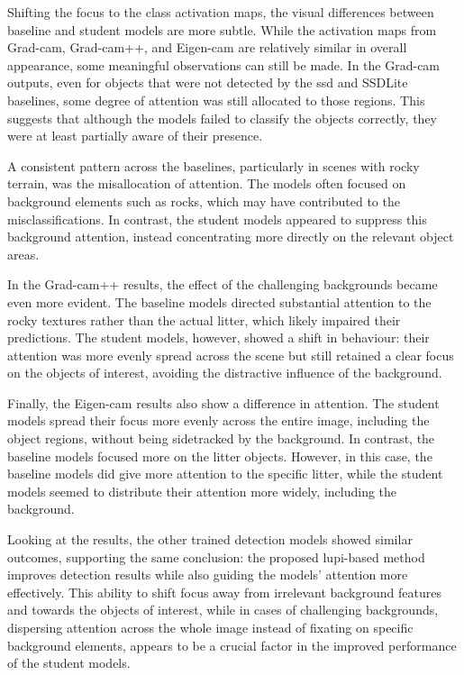Shifting the focus to the class activation maps, the visual differences between baseline and student models are more subtle. While the activation maps from Grad-\gls{cam}, Grad-\gls{cam}++, and Eigen-\gls{cam} are relatively similar in overall appearance, some meaningful observations can still be made. In the Grad-\gls{cam} outputs, even for objects that were not detected by the \gls{ssd} and SSDLite baselines, some degree of attention was still allocated to those regions. This suggests that although the models failed to classify the objects correctly, they were at least partially aware of their presence.

A consistent pattern across the baselines, particularly in scenes with rocky terrain, was the misallocation of attention. The models often focused on background elements such as rocks, which may have contributed to the misclassifications. In contrast, the student models appeared to suppress this background attention, instead concentrating more directly on the relevant object areas.

In the Grad-\gls{cam}++ results, the effect of the challenging backgrounds became even more evident. The baseline models directed substantial attention to the rocky textures rather than the actual litter, which likely impaired their predictions. The student models, however, showed a shift in behaviour: their attention was more evenly spread across the scene but still retained a clear focus on the objects of interest, avoiding the distractive influence of the background.

Finally, the Eigen-\gls{cam} results also show a difference in attention. The student models spread their focus more evenly across the entire image, including the object regions, without being sidetracked by the background. In contrast, the baseline models focused more on the litter objects. However, in this case, the baseline models did give more attention to the specific litter, while the student models seemed to distribute their attention more widely, including the background.

Looking at the results, the other trained detection models showed similar outcomes, supporting the same conclusion: the proposed \gls{lupi}-based method improves detection results while also guiding the models' attention more effectively. This ability to shift focus away from irrelevant background features and towards the objects of interest, while in cases of challenging backgrounds, dispersing attention across the whole image instead of fixating on specific background elements, appears to be a crucial factor in the improved performance of the student models.


